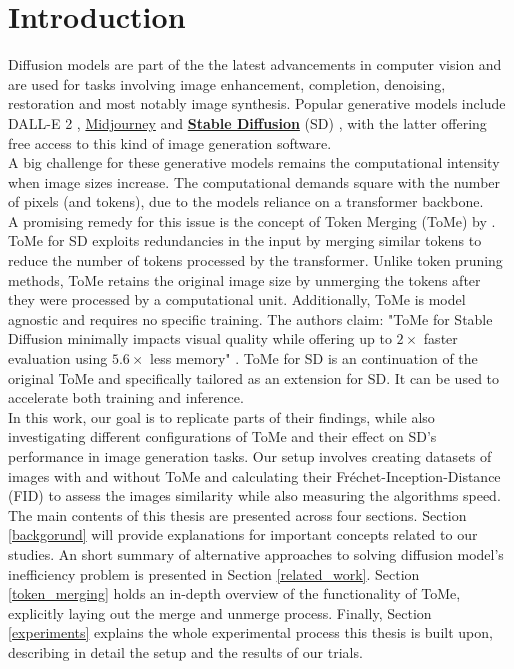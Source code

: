 \section{Introduction}
Diffusion models are part of the the latest advancements in computer vision and are used for tasks involving image enhancement, completion, denoising, restoration and most notably image synthesis. Popular generative models include DALL-E 2 \cite{ramesh2022hierarchical}, \href{https://www.midjourney.com}{Midjourney} and \href{https://github.com/CompVis/stable-diffusion}{\textbf{Stable Diffusion}} (SD) 
\cite{rombach2021highresolution}, with the latter offering free access to this kind of image generation software.\\
A big challenge for these generative models remains the computational intensity when image sizes increase. The computational demands square with the number of pixels (and tokens), due to the models reliance on a transformer backbone.\\
A promising remedy for this issue is the concept of Token Merging (ToMe) by \cite{bolya2023tomesd}. ToMe for SD exploits redundancies in the input by merging similar tokens to reduce the number of tokens processed by the transformer. Unlike token pruning methods, ToMe retains the original image size by unmerging the tokens after they were processed by a computational unit. Additionally, ToMe is model agnostic and requires no specific training. The authors claim: "ToMe for Stable Diffusion minimally impacts visual quality while offering up to $2 \times$ faster evaluation using $5.6 \times$ less memory" \cite{bolya2023tomesd}. ToMe for SD is an continuation of the original ToMe \cite{bolya2023tome} and specifically tailored as an extension for SD. It can be used to accelerate both training and inference.\\
In this work, our goal is to replicate parts of their findings, while also investigating different configurations of ToMe and their effect on SD's performance in image generation tasks. Our setup involves creating datasets of images with and without ToMe and calculating their Fréchet-Inception-Distance (FID) to assess the images similarity while also measuring the algorithms speed.\\
The main contents of this thesis are presented across four sections. Section \ref{backgorund} will provide explanations for important concepts related to our studies. An short summary of alternative approaches to solving diffusion model's inefficiency problem is presented in Section \ref{related_work}. Section \ref{token_merging} holds an in-depth overview of the functionality of ToMe, explicitly laying out the merge and unmerge process. Finally, Section \ref{experiments} explains the whole experimental process this thesis is built upon, describing in detail the setup and the results of our trials.\\

